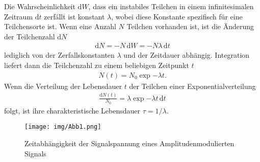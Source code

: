 Die Wahrscheinlichkeit $\text{d}W$, dass ein instabiles Teilchen in einem infinitesimalen Zeitraum $\text{d}t$ zerfällt ist konstant $\lambda$, wobei diese Konstante spezifisch für eine Teilchensorte ist. Wenn eine Anzahl $N$ Teilchen vorhanden ist, ist die Änderung der Teilchenzahl $\text{d}N$
\begin{align}
	\text{d}N = -N\,\text{d}W = -N\lambda\,\text{d}t
\end{align}
lediglich von der Zerfallskonstanten $\lambda$ und der Zeitdauer abhängig. Integration liefert dann die Teilchenzahl zu einem beliebigen Zeitpunkt $t$
\begin{align}
	N(t) = N_0 \exp{-\lambda t}.
\end{align}
Wenn die Verteilung der Lebensdauer $t$ der Teilchen einer Exponentialverteilung
\begin{align}
	\frac{\text{d}N(t)}{N_0} = \lambda \exp{-\lambda t}\,\text{d}t
\end{align}
folgt, ist ihre charakteristische Lebensdauer $\tau = 1/\lambda$.

\begin{figure}[h]
	\centering
	\texttt{[image: img/Abb1.png]}
	\caption{Zeitabhängigkeit der Signalspannung eines Amplitudenmodulierten Signals \cite{FP}}
\end{figure}
